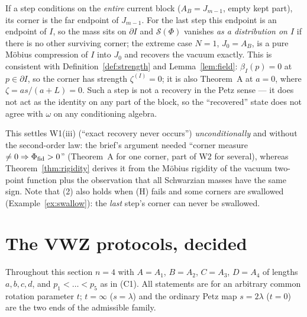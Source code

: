 \documentclass[11pt]{article}
\newcommand{\Sch}{\mathcal S}
\newcommand{\bI}{\beta_I}
\theoremstyle{definition}\newtheorem{example}[theorem]{Example}
\begin{document}
\begin{remark}\label{rem:degenerate}
If a step conditions on the \emph{entire} current block ($A_B=J_{m-1}$, empty kept part), its
corner is the far endpoint of $J_{m-1}$.  For the last step this endpoint is an endpoint of
$I$, so the mass sits on $\partial I$ and $\Sch(\Phi)$ vanishes \emph{as a distribution on $I$}
if there is no other surviving corner; the extreme case $N=1$, $J_0=A_B$, is a pure M\"obius
compression of $I$ into $J_0$ and recovers the vacuum exactly.  This is consistent with
Definition~\ref{def:strength} and Lemma~\ref{lem:field}: $\bI(p)=0$ at $p\in\partial I$, so the
corner has strength $\zeta^{(I)}=0$; it is also Theorem~A at $a=0$, where
$\zeta=as/(a+L)=0$.  Such a step is not a recovery in the Petz sense --- it does not act as the
identity on any part of the block, so the ``recovered'' state does not agree with $\omega$ on any
conditioning algebra.
\end{remark}

\begin{verdictok}
This settles W1(iii) (``exact recovery never occurs'') \emph{unconditionally} and without the
second-order law: the brief's argument needed ``corner measure $\ne0\Rightarrow\Phi_{\rm fid}>0$''
(Theorem~A for one corner, part of W2 for several), whereas
Theorem~\ref{thm:rigidity} derives it from the M\"obius rigidity of the vacuum two-point function
plus the observation that all Schwarzian masses have the same sign.  Note that (2) also holds
when (H) fails and some corners are swallowed (Example~\ref{ex:swallow}): the \emph{last} step's
corner can never be swallowed.
\end{verdictok}

\section{The VWZ protocols, decided}\label{sec:vwz}

Throughout this section $n=4$ with $A=A_1$, $B=A_2$, $C=A_3$, $D=A_4$ of lengths $a,b,c,d$, and
$p_1<\dots<p_5$ as in (C1).  All statements are for an arbitrary common rotation parameter $t$;
$t=\infty$ ($s=\lambda$) and the ordinary Petz map $s=2\lambda$ ($t=0$) are the two ends of the
admissible family.
\end{document}
